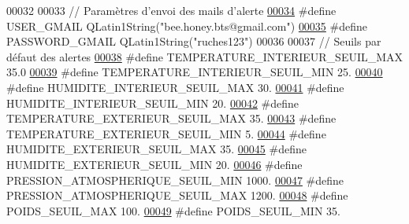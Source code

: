 \begin{DoxyCode}
00032 
00033 \textcolor{comment}{// Paramètres d'envoi des mails d'alerte}
\hyperlink{parametres_8h_a4a0b02d56c77af5d5aceb6c9f57cfb31}{00034} \textcolor{preprocessor}{#define USER\_GMAIL      QLatin1String("bee.honey.bts@gmail.com")}
\hyperlink{parametres_8h_a29c7597b5c4dfd015628a777f545bcb2}{00035} \textcolor{preprocessor}{#define PASSWORD\_GMAIL  QLatin1String("ruches123")}
00036 
00037 \textcolor{comment}{// Seuils par défaut des alertes}
\hyperlink{parametres_8h_a76f490066655530a774202e6204f2a92}{00038} \textcolor{preprocessor}{#define TEMPERATURE\_INTERIEUR\_SEUIL\_MAX     35.0}
\hyperlink{parametres_8h_a1f78dd3105c514060033c23f7b40a899}{00039} \textcolor{preprocessor}{#define TEMPERATURE\_INTERIEUR\_SEUIL\_MIN     25.}
\hyperlink{parametres_8h_afc1996946dfec64accdaa88f4e313058}{00040} \textcolor{preprocessor}{#define HUMIDITE\_INTERIEUR\_SEUIL\_MAX        30.}
\hyperlink{parametres_8h_a123e6e1d82333f6e038d37ef506d5762}{00041} \textcolor{preprocessor}{#define HUMIDITE\_INTERIEUR\_SEUIL\_MIN        20.}
\hyperlink{parametres_8h_a7630cd07e0f037b4057157febd9644fd}{00042} \textcolor{preprocessor}{#define TEMPERATURE\_EXTERIEUR\_SEUIL\_MAX     35.}
\hyperlink{parametres_8h_aeb90c8fd31e6aa6473edd143ce70e137}{00043} \textcolor{preprocessor}{#define TEMPERATURE\_EXTERIEUR\_SEUIL\_MIN     5.}
\hyperlink{parametres_8h_a25f8411ff3fd72788fdcd7487e7e8d28}{00044} \textcolor{preprocessor}{#define HUMIDITE\_EXTERIEUR\_SEUIL\_MAX        35.}
\hyperlink{parametres_8h_afc00f65688c19bd56711c244827c2c27}{00045} \textcolor{preprocessor}{#define HUMIDITE\_EXTERIEUR\_SEUIL\_MIN        20.}
\hyperlink{parametres_8h_a70a55fd4037201bf606fc9e9d54e61cb}{00046} \textcolor{preprocessor}{#define PRESSION\_ATMOSPHERIQUE\_SEUIL\_MIN    1000.}
\hyperlink{parametres_8h_a2d439ba3af9708601a7ae0edf3584d98}{00047} \textcolor{preprocessor}{#define PRESSION\_ATMOSPHERIQUE\_SEUIL\_MAX    1200.}
\hyperlink{parametres_8h_a41d2727214068bc11cea2e021fb6b237}{00048} \textcolor{preprocessor}{#define POIDS\_SEUIL\_MAX                     100.}
\hyperlink{parametres_8h_a289e59d08fbd111c6a5bd8a526a8098b}{00049} \textcolor{preprocessor}{#define POIDS\_SEUIL\_MIN                     35.}

\end{DoxyCode}
